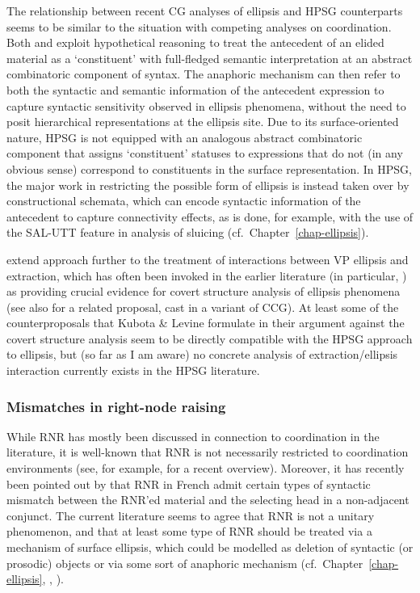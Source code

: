 \documentclass[output=paper]{langsci/langscibook}
\begin{document}
The relationship between recent CG analyses of ellipsis and
HPSG counterparts seems to be similar to the situation with competing
analyses on coordination. Both \citet{barker-sluicing} and
\citet{kubota-levine-pseudo} exploit hypothetical reasoning to treat the
antecedent of an elided material as a `constituent' with full-fledged
semantic interpretation at an abstract combinatoric component of
syntax. The anaphoric mechanism can then refer to both the syntactic
and semantic information of the antecedent expression to capture
syntactic sensitivity observed in ellipsis phenomena, without the need
to posit hierarchical representations at the ellipsis site. Due to its
surface-oriented nature, HPSG is not equipped with an analogous
abstract combinatoric component that assigns `constituent' statuses to
expressions that do not (in any obvious sense) correspond to
constituents in the surface representation. In HPSG, the major work in
restricting the possible form of ellipsis is instead
taken over by constructional schemata, which can encode
syntactic information of the antecedent to capture connectivity
effects, as is done, for example, with the use of the 
SAL-UTT feature in  analysis of sluicing
(cf.~Chapter~\ref{chap-ellipsis}).

\citet[Chapter 8]{KubotaLevineBook} extend 
 approach further to the treatment of
interactions between  VP ellipsis and extraction, which has often been
invoked in the earlier literature (in particular, \citet{kennedy2003})
as providing crucial evidence for  covert structure analysis of
ellipsis phenomena (see also \citet{jacobson14ellipsis} for a related
proposal, cast in a variant of CCG).
At least some of the counterproposals that Kubota \& Levine formulate
in their argument against the covert structure analysis seem to be
directly compatible with the HPSG approach to ellipsis,  but (so far
as I am aware)  no concrete analysis of extraction/ellipsis
interaction currently exists in the HPSG literature.




\subsubsection{Mismatches in right-node raising}

While RNR has mostly been discussed in connection to coordination in
the literature, it is well-known that RNR is not necessarily
restricted to coordination environments (see, for example, \citet{wilder-ellipsis-handbook}
for a recent overview). Moreover, it
has recently been pointed out by \citet{ACS2016a-u} that RNR in French
admit certain types of syntactic mismatch between the RNR'ed material
and the selecting head in a non-adjacent conjunct.
The current literature seems to agree that RNR is not a unitary
phenomenon, and that at least some type of RNR should be treated via a
mechanism of surface ellipsis, which could be modelled as deletion of
syntactic (or prosodic) objects or via some sort of anaphoric
mechanism (cf.\ Chapter~\ref{chap-ellipsis}, \citet{Chaves2014a-u}, \citet{kubota-levine-pseudo}).
\end{document}
